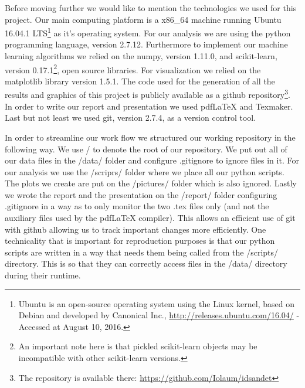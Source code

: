 \documentclass[reqno,openany,12pt]{amsbook}
\begin{document}
Before moving further we would like to mention the technologies we used for this project. Our main computing platform is a x86\_{}64 machine running Ubuntu 16.04.1 LTS\footnote{Ubuntu is an open-source operating system using the Linux kernel, based on Debian and developed by Canonical Inc., \url{http://releases.ubuntu.com/16.04/} - Accessed at August 10, 2016.} as it's operating system. For our analysis we are using the python\cite{pyt} programming language, version 2.7.12. Furthermore to implement our machine learning algorithms we relied on the numpy\cite{numpy}, version 1.11.0, and scikit-learn\cite{skl}, version 0.17.1\footnote{An important note here is that pickled scikit-learn objects may be incompatible with other scikit-learn versions.}, open source libraries. For visualization we relied on the matplotlib\cite{matpl} library version 1.5.1. The code used for the generation of all the results and graphics of this project is publicly available as a github repository\footnote{The repository is available there: \url{https://github.com/Iolaum/idsandet}}. In order to write our report and presentation we used pdfLaTeX and Texmaker. Last but not least we used git, version 2.7.4, as a version control tool.


In order to streamline our work flow we structured our working repository in the following way. We use / to denote the root of our repository. We put out all of our data files in the /data/ folder and configure .gitignore to ignore files in it. For our analysis we use the /scriprs/ folder where we place all our python scripts. The plots we create are put on the /pictures/ folder which is also ignored. Lastly we wrote the report and the presentation on the /report/ folder configuring .gitignore in a way as to only monitor the two .tex files only (and not the auxiliary files used by the pdfLaTeX compiler). This allows an efficient use of git with github allowing us to track important changes more efficiently. One technicality that is important for reproduction purposes is that our python scripts are written in a way that needs them being called from the /scripts/ directory. This is so that they can correctly access files in the /data/ directory during their runtime.
\end{document}
